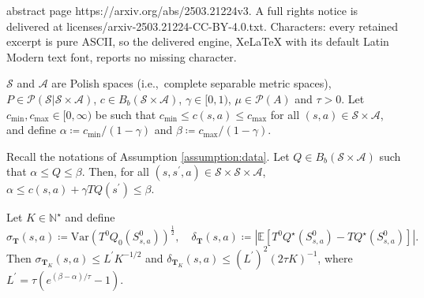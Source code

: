 \documentclass[10pt,a4paper]{amsart}
\def\N{{\mathbb{N}}}
\def\cA{\mathcal{A}}
\def\cP{\mathcal{P}}
\def\cS{\mathcal{S}}
\begin{document}
abstract page https://arxiv.org/abs/2503.21224v3. A full rights notice is delivered at licenses/arxiv-2503.21224-CC-BY-4.0.txt. Characters: every retained excerpt is pure ASCII, so the delivered engine, XeLaTeX with its default Latin Modern text font, reports no missing character.
\begin{assumption}
    \label{assumption:data}
    $\mathcal S$ and $  \mathcal A$ are Polish spaces (i.e.,\   complete separable metric spaces),
    $P\in \cP(\cS|\cS\times \cA)$,
    $c\in B_b(\cS\times \cA)$,
    $\gamma\in [0,1)$,
    $\mu\in \cP(A)$
    and $\tau>0$.
Let
     $c_{\min}, c_{\max}\in [0,\infty)$ be such that $   c_{\min} \leq c(s,a) \leq c_{\max}$ for all $(s,a ) \in \mathcal S\times  \mathcal A$,
     and define 
      $\alpha \coloneqq c_{\min}/(1-\gamma) $
      and $\beta \coloneqq c_{\max}/(1-\gamma)$.
     
\end{assumption}

\begin{lemma}
    \label{lemma:boundedness-of-iterates}
    Recall the notations of Assumption \ref{assumption:data}. Let $Q \in B_b(\mathcal S \times \mathcal A)$ such that $ \alpha \leq Q \leq \beta$. Then, for all $(s,s^\prime,a) \in \mathcal S \times \mathcal S \times \mathcal A$, $\alpha \leq c(s,a) + \gamma  TQ (s^\prime) \leq \beta$.
\end{lemma}

\begin{lemma}
    \label{lemma:additional-MC-bias}
    Let $K \in \N^\star$ and define
    $$
     \sigma_{\mathbf T}(s,a)  \coloneqq \mathrm{Var} \left(T^0 Q_0 \left(S^0_{s,a}\right)\right)^{\frac{1}{2}},
        \quad
        \delta_{\mathbf T}(s,a) \coloneqq \left| \mathbb E \left[ T^0Q^\star\left(S^0_{s,a}\right) - TQ ^{\star}\left(S^0_{s,a}\right)\right] \right|.
    $$
    Then  
    $\sigma_{\mathbf T_K}(s,a) \leq L^\prime K^{-1/2}$ and $ \delta_{ \mathbf{T}_K} (s,a) \leq (L^\prime)^2 (2 \tau K) ^{-1}$,
    where $L^\prime  = \tau \left( e^{(\beta - \alpha) / \tau} - 1 \right)$.
\end{lemma}
\end{document}
